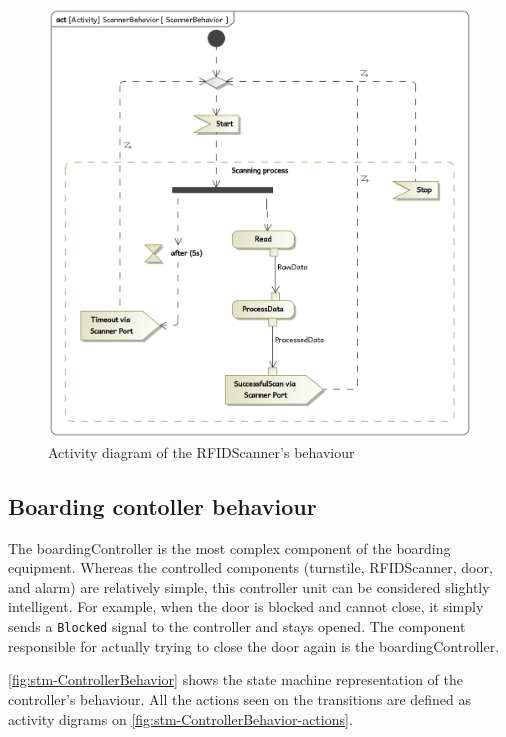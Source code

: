 \documentclass[a4paper]{article}
\begin{document}
\begin{figure}
	\includegraphics[width=\textwidth]{act-ScannerBehavior.jpg}
	\caption{Activity diagram of the \gls{RFIDScanner}'s behaviour}%
	\label{fig:act-ScannerBehavior}
\end{figure}


\subsection{Boarding contoller behaviour}

The \gls{boardingController} is the most complex component of the boarding
equipment. Whereas the controlled components (\gls{turnstile},
\gls{RFIDScanner}, door, and alarm) are relatively simple, this controller unit
can be considered slightly intelligent. For example, when the door is blocked
and cannot close, it simply sends a \texttt{Blocked} signal to the controller
and stays opened. The component responsible for actually trying to close the
door again is the \gls{boardingController}.

\cref{fig:stm-ControllerBehavior} shows the state machine representation of the
controller's behaviour. All the actions seen on the transitions are defined as
activity digrams on \cref{fig:stm-ControllerBehavior-actions}.
\end{document}
